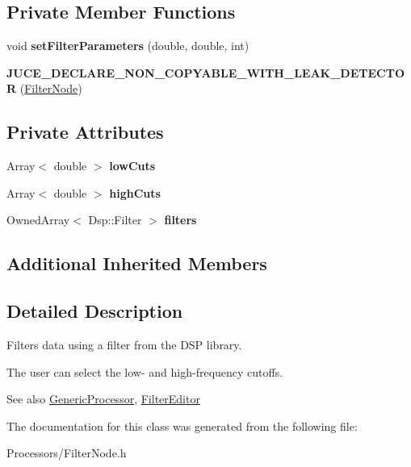 \subsection*{Private Member Functions}
\begin{DoxyCompactItemize}
\item 
\hypertarget{classFilterNode_acbad7bee784f6b0f8704a625463689fc}{void {\bfseries set\-Filter\-Parameters} (double, double, int)}\label{classFilterNode_acbad7bee784f6b0f8704a625463689fc}

\item 
\hypertarget{classFilterNode_a119367d974155d2a2e03ac95600840aa}{{\bfseries J\-U\-C\-E\-\_\-\-D\-E\-C\-L\-A\-R\-E\-\_\-\-N\-O\-N\-\_\-\-C\-O\-P\-Y\-A\-B\-L\-E\-\_\-\-W\-I\-T\-H\-\_\-\-L\-E\-A\-K\-\_\-\-D\-E\-T\-E\-C\-T\-O\-R} (\hyperlink{classFilterNode}{Filter\-Node})}\label{classFilterNode_a119367d974155d2a2e03ac95600840aa}

\end{DoxyCompactItemize}
\subsection*{Private Attributes}
\begin{DoxyCompactItemize}
\item 
\hypertarget{classFilterNode_a15964c108a5c13314f1db847eb393ae8}{Array$<$ double $>$ {\bfseries low\-Cuts}}\label{classFilterNode_a15964c108a5c13314f1db847eb393ae8}

\item 
\hypertarget{classFilterNode_a66bef50d236e643a4db0a5249a799431}{Array$<$ double $>$ {\bfseries high\-Cuts}}\label{classFilterNode_a66bef50d236e643a4db0a5249a799431}

\item 
\hypertarget{classFilterNode_ae3c8b408bdc08a967069c3918c2314c3}{Owned\-Array$<$ Dsp\-::\-Filter $>$ {\bfseries filters}}\label{classFilterNode_ae3c8b408bdc08a967069c3918c2314c3}

\end{DoxyCompactItemize}
\subsection*{Additional Inherited Members}


\subsection{Detailed Description}
Filters data using a filter from the D\-S\-P library.

The user can select the low-\/ and high-\/frequency cutoffs.

\begin{DoxySeeAlso}{See also}
\hyperlink{classGenericProcessor}{Generic\-Processor}, \hyperlink{classFilterEditor}{Filter\-Editor} 
\end{DoxySeeAlso}


The documentation for this class was generated from the following file\-:\begin{DoxyCompactItemize}
\item 
Processors/Filter\-Node.\-h\end{DoxyCompactItemize}

